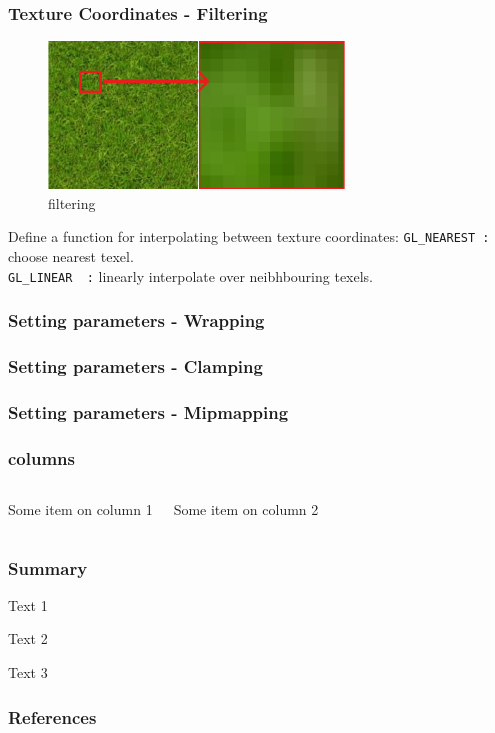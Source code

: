 \documentclass{beamer}
\begin{document}
\begin{frame}
\frametitle{Texture Coordinates - Filtering}
\begin{figure}
\includegraphics[width=0.7\textwidth]{images/filtering.png}
\caption{filtering}
\end{figure}

Define a function for interpolating between texture coordinates:
\texttt{GL\_NEAREST :} choose nearest texel.\\
\texttt{GL\_LINEAR\ \  :} linearly interpolate over neibhbouring texels.



\end{frame}

\begin{frame}
\frametitle{Setting parameters - Wrapping}
\end{frame}

\begin{frame}
\frametitle{Setting parameters - Clamping}
\end{frame}

\begin{frame}
\frametitle{Setting parameters - Mipmapping}
\end{frame}

\begin{frame}
\frametitle{columns}
\begin{columns}
Some item on column 1

Some item on column 2
\end{columns}
\end{frame}


%
%
%
\begin{frame}
\frametitle{Summary}
Text 1

\vspace{5mm}
Text 2

\vspace{5mm}
Text 3
\end{frame}


%
%
%
\begin{frame}
\frametitle{References}
\nocite{*}
{}

\end{frame}
\end{document}
